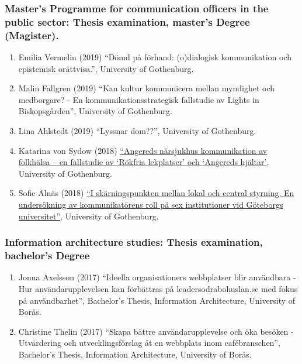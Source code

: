 \documentclass[
]{article}
\providecommand{\tightlist}{%
  \setlength{\itemsep}{0pt}\setlength{\parskip}{0pt}}
\begin{document}
\hypertarget{masters-programme-for-communication-officers-in-the-public-sector-thesis-examination-masters-degree-magister.}{%
\subsubsection{Master's Programme for communication officers in the
public sector: Thesis examination, master's Degree
(Magister).}\label{masters-programme-for-communication-officers-in-the-public-sector-thesis-examination-masters-degree-magister.}}

\begin{enumerate}
\def\labelenumi{\arabic{enumi}.}
\tightlist
\item
  Emilia Vermelin (2019) ``Dömd på förhand: (o)dialogisk kommunikation
  och epistemisk orättvisa.'', University of Gothenburg.
\item
  Malin Fallgren (2019) ``Kan kultur kommunicera mellan myndighet och
  medborgare? - En kommunikationsstrategisk fallstudie av Lights in
  Biskopsgården'', University of Gothenburg.
\item
  Lina Ahlstedt (2019) ``Lyssnar dom??'', University of Gothenburg.
\item
  Katarina von Sydow (2018)
  \href{https://gupea.ub.gu.se/handle/2077/58013}{``Angereds närsjukhus
  kommunikation av folkhälsa -- en fallstudie av `Rökfria lekplatser'
  och `Angereds hjältar'}, University of Gothenburg.
\item
  Sofie Alnäs (2018) \href{https://gupea.ub.gu.se/handle/2077/58021}{``I
  skärningspunkten mellan lokal och central styrning. En undersökning av
  kommunikatörens roll på sex institutioner vid Göteborgs
  universitet''}, University of Gothenburg.
\end{enumerate}

\hypertarget{information-architecture-studies-thesis-examination-bachelors-degree}{%
\subsubsection{Information architecture studies: Thesis examination,
bachelor's
Degree}\label{information-architecture-studies-thesis-examination-bachelors-degree}}

\begin{enumerate}
\def\labelenumi{\arabic{enumi}.}
\tightlist
\item
  Jonna Axelsson (2017) ``Ideella organisationers webbplatser blir
  användbara - Hur användarupplevelsen kan förbättras på
  leadersodrabohuslan.se med fokus på användbarhet'', Bachelor's Thesis,
  Information Architecture, University of Borås.
\item
  Christine Thelin (2017) ``Skapa bättre användarupplevelse och öka
  besöken - Utvärdering och utvecklingsförslag åt en webbplats inom
  cafébranschen'', Bachelor's Thesis, Information Architecture,
  University of Borås.
\end{enumerate}
\end{document}
